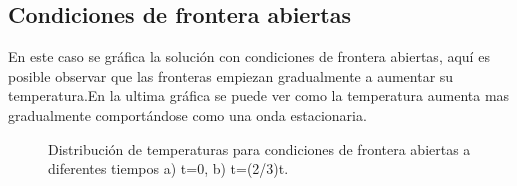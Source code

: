 \documentclass{report}
\begin{document}
\subsection*{Condiciones de frontera abiertas}
En este caso se gráfica la solución con condiciones de frontera abiertas, aquí es posible observar que las fronteras empiezan gradualmente a aumentar su temperatura.En la ultima gráfica se puede ver como la temperatura aumenta mas gradualmente comportándose como una onda estacionaria.
\begin{figure}[H]
    \centering
        \caption{Distribución de temperaturas para condiciones de frontera abiertas a diferentes tiempos a) t=0, b) t=(2/3)t.}
    \label{fig:Condicionesabieertas}
\end{figure}
\end{document}
